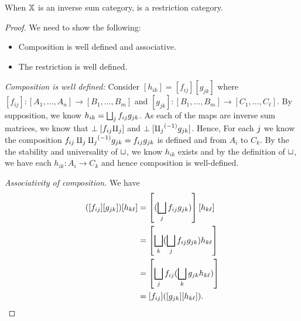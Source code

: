 \begin{lemma}\label{lem:inverse_matrix_category_is_a_restriction_category}
  When $\mathbb{X}$ is an inverse sum category, \imatx is a restriction category.
\end{lemma}
\begin{proof}
  We need to show the following:
  \begin{itemize}
    \item Composition is well defined and associative.
    \item The restriction is well defined.
  \end{itemize}

  \emph{Composition is well defined:} Consider $[h_{i k}] = [f_{i j}] [g_{j k}]$ where $[f_{i j}]:
  [A_1,\ldots, A_n] \to [B_1,\ldots, B_m]$ and $[g_{j k}]: [B_1,\ldots, B_m] \to [C_1,\ldots,
  C_\ell]$. By supposition, we know $h_{i k} = \bigsqcup_j f_{i j} g_{j k}$. As each of
  the maps are inverse sum matrices, we know that $\perp [f_{i j} \amalg_{j}]$ and
  $\perp[{\amalg_{j}}^{(-1)}g_{j k}]$. Hence, For each $j$ we know the composition $f_{i j}
  \amalg_{j} {\amalg_{j}}^{(-1)}g_{j k} = f_{i j} g_{j k}$ is defined and from $A_i$ to $C_{k}$. By
  the the stability and universality of $\sqcup$, we know $h_{i k}$ exists and by the definition of
  $\sqcup$, we have each $h_{i k}: A_i \to C_k$ and hence composition is well-defined.

  \emph{Associativity of composition.} We have
  \begin{align*}
    ([f_{i j}] [g_{j k}]) [h_{k \ell}]
        &= \left[(\bigsqcup_j f_{i j}  g_{j k})\right] [h_{k \ell}]\\
        &=\left[ \bigsqcup_k (\bigsqcup_j f_{i j} g_{j k}) h_{k \ell}\right]\\
        &=\left[ \bigsqcup_j f_{i j}  (\bigsqcup_k g_{j k} h_{k \ell})\right]\\
        &=[ f_{i j} ]  ([g_{j k}] [h_{k \ell}]).
  \end{align*}


\end{proof}
